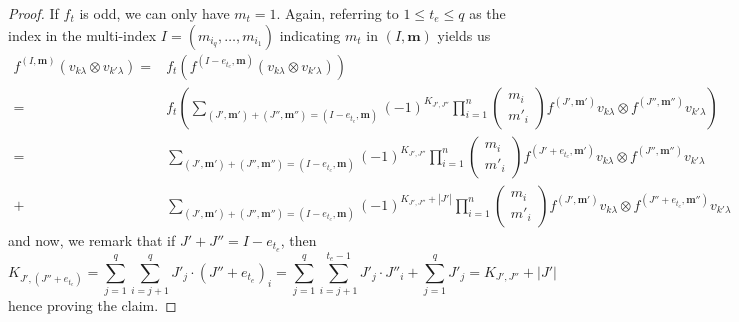 \documentclass[10pt,a4paper]{amsart}
\begin{document}
\begin{proof}
    If $f_{t}$ is odd, we can only have $m_t=1$. 
    Again, referring to $1\leq t_{e}\leq q$ as the index in the multi-index $I=(m_{i_{q}},\dots,m_{i_{1}})$ indicating $m_{t}$ in $(I,\mathbf{m})$ yields us
    \begin{align*}
        f^{(I,\mathbf{m})}(v_{k\lambda}\otimes v_{k'\lambda})=&f_{t}(f^{(I-e_{t_{e}},\mathbf{m})}(v_{k\lambda}\otimes v_{k'\lambda}))\\
        =&f_{t}\left(\sum\limits_{(J',\mathbf{m}')+(J'',\mathbf{m}'')=(I-e_{t_{e}},\mathbf{m})}(-1)^{K_{J',J''}}\prod\limits_{i=1}^{n}\begin{pmatrix}
            m_i\\
            m'_i
        \end{pmatrix}f^{(J',\mathbf{m}')}v_{k\lambda}\otimes f^{(J'',\mathbf{m}'')}v_{k'\lambda}\right)\\
        =&\sum\limits_{(J',\mathbf{m}')+(J'',\mathbf{m}'')=(I-e_{t_{e}},\mathbf{m})}(-1)^{K_{J',J''}}\prod\limits_{i=1}^{n}\begin{pmatrix}
            m_i\\
            m'_i
        \end{pmatrix}f^{(J'+e_{t_{e}},\mathbf{m}')}v_{k\lambda}\otimes f^{(J'',\mathbf{m}'')}v_{k'\lambda}\\
        +&\sum\limits_{(J',\mathbf{m}')+(J'',\mathbf{m}'')=(I-e_{t_{e}},\mathbf{m})}(-1)^{K_{J',J''}+|J'|}\prod\limits_{i=1}^{n}\begin{pmatrix}
            m_i\\
            m'_i
        \end{pmatrix}f^{(J',\mathbf{m}')}v_{k\lambda}\otimes f^{(J''+e_{t_{e}},\mathbf{m}'')}v_{k'\lambda}
    \end{align*}
    and now, we remark that if $J'+J''=I-e_{t_{e}}$, then
    \begin{equation*}
        K_{J',(J''+e_{t_{{e}}})}=\sum^q_{j=1}\sum^q_{i=j+1} J'_j\cdot (J''+e_{t_{e}})_i=\sum^q_{j=1}\sum^{t_{e}-1}_{i=j+1} J'_j\cdot J''_i+\sum^q_{j=1}J'_j=K_{J',J''}+|J'|
    \end{equation*}
    hence proving the claim.
\end{proof}
\end{document}
